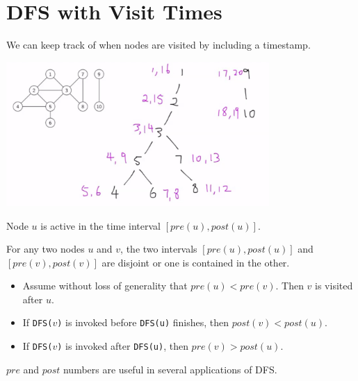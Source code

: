 \section{DFS with Visit Times}
\begin{itemize}
    \item We can keep track of when nodes are visited by including a timestamp.
    \item[] 
    \begin{center}
        \item[] \includegraphics[width=0.75\textwidth]{lecture17/images/undirected-dfs-tree-time.jpg}
    \end{center}
    \item Node $u$ is active in the time interval $[ pre(u), post(u) ]$.
    \item For any two nodes $u$ and $v$, the two intervals $[pre(u), post(u)]$ and $[pre(v), post(v)]$ are disjoint or one is contained in the other.
    \begin{itemize}
        \item Assume without loss of generality that $pre(u) < pre(v)$. Then $v$ is visited after $u$.
        \item If \texttt{DFS($v$)} is invoked before \texttt{DFS(u)} finishes, then $post(v) < post(u)$.
        \item If \texttt{DFS($v$)} is invoked after \texttt{DFS(u)}, then $pre(v) > post(u)$.
    \end{itemize}
    \item $pre$ and $post$ numbers are useful in several applications of DFS.
\end{itemize}

